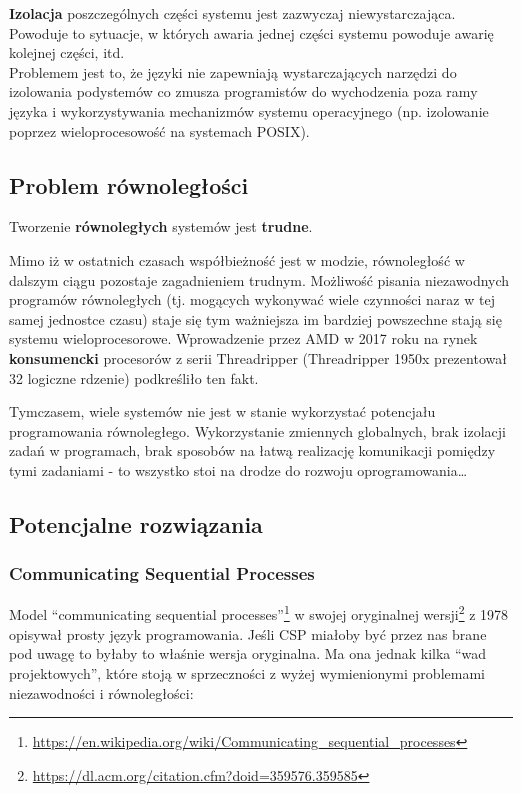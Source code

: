 \documentclass[11pt,oneside,a4paper,titlepage,onecolumn]{article}
\begin{document}
\textbf{Izolacja} poszczególnych części systemu jest zazwyczaj niewystarczająca. Powoduje to
sytuacje, w których awaria jednej części systemu powoduje awarię kolejnej części, itd. \\
Problemem jest to, że języki nie zapewniają wystarczających narzędzi do izolowania podystemów co
zmusza programistów do wychodzenia poza ramy języka i wykorzystywania mechanizmów systemu
operacyjnego (np. izolowanie poprzez wieloprocesowość na systemach POSIX).

\subsection{Problem równoległości}

\begin{center}
    Tworzenie \textbf{równoległych} systemów jest \textbf{trudne}.
\end{center}

Mimo iż w ostatnich czasach współbieżność jest w modzie, równoległość w dalszym ciągu pozostaje
zagadnieniem trudnym. Możliwość pisania niezawodnych programów równoległych (tj. mogących wykonywać
wiele czynności naraz w tej samej jednostce czasu) staje się tym ważniejsza im bardziej powszechne
stają się systemu wieloprocesorowe.
Wprowadzenie przez AMD w 2017 roku na rynek \textbf{konsumencki} procesorów z serii
Threadripper (Threadripper 1950x prezentował 32 logiczne rdzenie) podkreśliło ten fakt.

Tymczasem, wiele systemów nie jest w stanie wykorzystać potencjału programowania równoległego.
Wykorzystanie zmiennych globalnych, brak izolacji zadań w programach, brak sposobów na łatwą realizację
komunikacji pomiędzy tymi zadaniami - to wszystko stoi na drodze do rozwoju oprogramowania\ldots

\subsection{Potencjalne rozwiązania}

\subsubsection{Communicating Sequential Processes}

Model ``communicating sequential
processes''\footnote{\url{https://en.wikipedia.org/wiki/Communicating_sequential_processes}}
w swojej oryginalnej wersji\footnote{\url{https://dl.acm.org/citation.cfm?doid=359576.359585}} z 1978
opisywał prosty język programowania.
Jeśli CSP miałoby być przez nas brane pod uwagę to byłaby to właśnie wersja oryginalna. Ma ona jednak
kilka ``wad projektowych'', które stoją w sprzeczności z wyżej wymienionymi problemami niezawodności i
równoległości:
\end{document}
